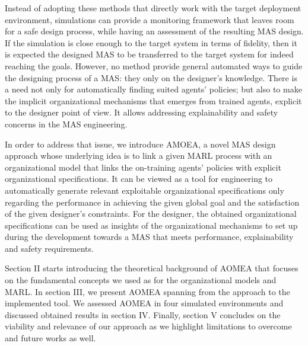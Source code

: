 \documentclass[runningheads]{llncs}
\begin{document}

Instead of adopting these methods that directly work with the target deployment environment, simulations can provide a monitoring framework that leaves room for a safe design process, while having an assessment of the resulting MAS design. If the simulation is close enough to the target system in terms of fidelity, then it is expected the designed MAS to be transferred to the target system for indeed reaching the goals.
However, no method provide general automated ways to guide the designing process of a MAS: they only on the designer's knowledge. There is a need not only for automatically finding suited agents' policies; but also to make the implicit organizational mechanisms that emerges from trained agents, explicit to the designer point of view. It allows addressing explainability and safety concerns in the MAS engineering.


In order to address that issue, we introduce AMOEA, a novel MAS design approach whose underlying idea is to link a given MARL process with an organizational model that links the on-training agents' policies with explicit organizational specifications. It can be viewed as a tool for engineering to automatically generate relevant exploitable organizational specifications only regarding the performance in achieving the given global goal and the satisfaction of the given designer's constraints. For the designer, the obtained organizational specifications can be used as insights of the organizational mechanisms to set up during the development towards a MAS that meets performance, explainability and safety requirements.



Section II starts introducing the theoretical background of AOMEA that focuses on the fundamental concepts we used as for the organizational models and MARL.
In section III, we present AOMEA spanning from the approach to the implemented tool. We assessed AOMEA in four simulated environments and discussed obtained results in section IV. Finally, section V concludes on the viability and relevance of our approach as we highlight limitations to overcome and future works as well.
\end{document}
